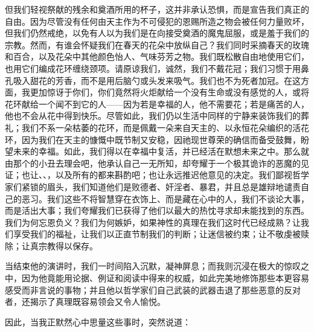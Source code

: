 但我们轻视祭献的残余和奠酒所用的杯子，这并非承认恐惧，而是宣告我们真正的自由。因为尽管没有任何由天主作为不可侵犯的恩赐所造之物会被任何力量败坏，但我们仍然戒绝，以免有人以为我们是在向接受奠酒的魔鬼屈服，或是羞于我们的宗教。然而，有谁会怀疑我们在春天的花朵中放纵自己？我们同时采摘春天的玫瑰和百合，以及花朵中其他颜色怡人、气味芬芳之物。我们既松散自由地使用它们，也用它们编成花环缠绕颈项。请原谅我们，诚然，我们不戴花冠；我们习惯于用鼻孔吸入甜花的芳香，而不是用后脑勺或头发来吸气。我们也不为死者加冠。在这方面，我更加惊讶于你们，你们竟然将火炬献给一个没有生命或没有感觉的人，或将花环献给一个闻不到它的人——因为若是幸福的人，他不需要花；若是痛苦的人，他也不会从花中得到快乐。尽管如此，我们仍以生活中同样的宁静来装饰我们的葬礼；我们不系一朵枯萎的花环，而是佩戴一朵来自天主的、以永恒花朵编织的活花环，因为我们在天主的慷慨中既节制又安稳，因祂现世尊荣的确信而备受鼓舞，盼望未来的幸福。如此，我们得以在幸福中复活，并已经活在默想未来之中。那么就由那个的小丑去理会吧，他承认自己一无所知，却夸耀于一个极其诡诈的恶魔的见证；也让、、，以及所有的都来斟酌吧；也让永远推迟他意见的决定。我们鄙视哲学家们紧锁的眉头，我们知道他们是败德者、奸淫者、暴君，并且总是雄辩地谴责自己的恶习。我们这些不将智慧穿在衣饰上、而是藏在心中的人，我们不谈论大事，而是活出大事；我们夸耀我们已获得了他们以最大的热忱寻求却未能找到的东西。我们为何忘恩负义？我们为何嫉妒，如果神性的真理在我们这时代已经成熟？让我们享受我们的福祉，让我们以正直节制我们的判断；让迷信被约束；让不敬虔被赎除；让真宗教得以保存。\par


当结束他的演讲时，我们一时间陷入沉默，凝神屏息；而我则沉浸在极大的惊叹之中，因为他竟能用论据、例证和阅读中得来的权威，如此完美地修饰那些本更容易感受而非言说的事物；并且他以哲学家们自己武装的武器击退了那些恶意的反对者，还揭示了真理既容易领会又令人愉悦。\par


因此，当我正默然心中思量这些事时，突然说道：\par

